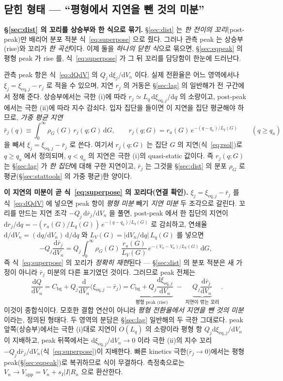\documentclass[11pt,a4paper]{article}
\newcommand{\dd}{\mathrm{d}}
\newcommand{\eq}{\mathrm{eq}}
\newcommand{\app}{\mathrm{app}}
\newcommand{\bg}{\mathrm{bg}}
\begin{document}
\subsection{닫힌 형태 — ``평형에서 지연을 뺀 것의 미분''}
\textbf{\S\ref{sec:dist} 의 꼬리를 상승부와 한 식으로 묶기.} \S\ref{sec:dist} 는 \emph{한 전이의 꼬리}(post-peak)만
배리어 분포 적분 식~\eqref{eq:superpose} 으로 줬다. 그러나 관측 peak 는 상승부(rise)와 꼬리가 \emph{한 곡선}이다.
이제 둘을 \emph{하나의 닫힌 식}으로 묶으면, \S\ref{sec:eqpeak} 의 평형 peak 가 rise 를, 식~\eqref{eq:superpose} 가
그 뒤 꼬리를 담당함이 한눈에 드러난다.

관측 peak 항은 식~\eqref{eq:dQdV} 의 $Q_j\,\dd\xi_j/\dd V_n$ 이다. 실제 전환율은 어느 영역에서나
$\xi_j=\xi_{\eq,j}-r_j$ 로 적을 수 있으며, 지연 $r_j$ 의 거동은 \S\ref{sec:lag} 의 일반해가 전 구간에서 정해
준다. 상승부에서는 극한 (i)에 따라 $r_j\simeq L_q\,\dd\xi_{\eq,j}/\dd q$ 의 소량이고, post-peak 에서는 극한
(ii)에 따라 지수 감쇠다. 입자 집단을 들이면 이 지연을 집단 평균해야 하므로, \emph{가중 평균 지연}
\[
\bar r_j(q)\equiv\int_0^\infty\rho_G(G)\,r_j(q;G)\,\dd G,\qquad
r_j(q;G)=r_a(G)\,e^{-(q-q_a)/L_q(G)}\qquad(q\ge q_a)
\]
을 빼서 $\xi_j=\xi_{\eq,j}-\bar r_j$ 로 쓴다. 여기서 $r_j(q;G)$ 는 집단 $G$ 의 지연(식~\eqref{eq:rsol})로
$q\ge q_a$ 에서 정의되며, $q<q_a$ 의 지연은 극한 (i)의 quasi-static 값이다. 즉 $r_j(q;G)$ 는 \S\ref{sec:lag} 가 \emph{한 집단}에 대해 구한 지연이고,
$\bar r_j$ 는 그것을 \S\ref{sec:dist} 의 분포 $\rho_G$ 로 평균(\S\ref{sec:stattools} 의 가중 평균)한 양이다.

\textbf{이 지연의 미분이 곧 식~\eqref{eq:superpose} 의 꼬리다(연결 확인).} $\xi_j=\xi_{\eq,j}-\bar r_j$ 를
식~\eqref{eq:dQdV} 에 넣으면 peak 항이 \emph{평형 미분} 빼기 \emph{지연 미분} 두 조각으로 갈린다. 꼬리를 만드는
지연 조각 $-Q_j\,\dd\bar r_j/\dd V_n$ 을 풀면, post-peak 에서 한 집단의 지연이 $\dd r_j/\dd q=
-(r_a(G)/L_q(G))\,e^{-(q-q_a)/L_q(G)}$ 로 감쇠하고, 연쇄율 $\dd/\dd V_n=(\dd q/\dd V_n)\,\dd/\dd q$ 와
$L_V(G)=|\dd V_n/\dd q|\,L_q(G)$ 를 넣으면
\[
-Q_j\frac{\dd\bar r_j}{\dd V_n}
=Q_j\!\int_0^\infty\!\rho_G(G)\,\frac{r_a(G)}{L_V(G)}\,e^{-(V_n-V_a)/L_V(G)}\,\dd G,
\]
즉 식~\eqref{eq:superpose} 의 꼬리가 \emph{정확히 재현}된다 — \S\ref{sec:dist} 의 분포 적분은 새 가정이 아니라
$\bar r_j$ 미분의 다른 표기였던 것이다. 그러므로 peak 전체는
\begin{equation}
\boxed{\;\frac{\dd Q}{\dd V_n}=C_\bg+Q_j\frac{\dd}{\dd V_n}\big(\xi_{\eq,j}-\bar r_j\big)
=\underbrace{C_\bg+Q_j\frac{\dd\xi_{\eq,j}}{\dd V_n}}_{\text{평형 peak (rise)}}
\;-\;\underbrace{Q_j\frac{\dd\bar r_j}{\dd V_n}}_{\text{지연이 깎는 꼬리}}\;.}
\label{eq:closed}
\end{equation}
이것이 종합식이다. 모호한 결합 연산이 아니라 \emph{평형 전환율에서 지연을 뺀 것의 미분}이라는, 정의된 형태다.
두 영역의 분담은 \S\ref{sec:lag} 일반해의 두 극한 그대로다. peak 앞쪽(상승부)에서는 극한 (i)대로 지연이
$O(L_q)$ 의 소량이라 평형 항 $Q_j\dd\xi_{\eq,j}/\dd V_n$ 이 지배하고, peak 뒤쪽에서는
$\dd\xi_{\eq,j}/\dd V_n\to0$ 이라 극한 (ii)의 지수 꼬리 $-Q_j\dd\bar r_j/\dd V_n$(식~\eqref{eq:superpose})이
지배한다. 빠른 kinetics 극한($\bar r_j\to0$)에서는 평형 peak(\S\ref{sec:eqpeak})로 복귀하므로 식이 무결하다.
측정축으로는 $V_n\to V_\app=V_n+s_I|I|R_n$ 으로 환산한다.
\end{document}
